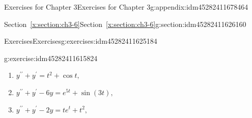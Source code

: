 \documentclass[oneside,10pt,]{book}
\numberwithin{equation}{section}
\numberwithin{equation}{section}
\begin{document}
\begin{appendixptx}{Exercises for Chapter 3}{}{Exercises for Chapter 3}{}{}{g:appendix:idm45282411678464}
\begin{sectionptx}{Section~\ref*{x:section:ch3-6}}{}{Section~\ref*{x:section:ch3-6}}{}{}{g:section:idm45282411626160}
\begin{exercises-subsection-numberless}{Exercises}{}{Exercises}{}{}{g:exercises:idm45282411625184}
\begin{divisionexercise}{7}{}{}{g:exercise:idm45282411615824}
\begin{enumerate}[label=(\alph*)]
\item{}\(y^{\prime\prime}+y^{\prime}=t^{2}+\cos t,\)%
\item{}\(y^{\prime\prime}+y^{\prime}-6y=e^{5t}+\sin(3t),\)%
\item{}\(y^{\prime\prime}+y^{\prime}-2y=te^{t}+t^{2},\)%
\end{enumerate}
%
\end{divisionexercise}%
\end{exercises-subsection-numberless}
\end{sectionptx}
\end{appendixptx}
%
\backmatter
%
\end{document}
